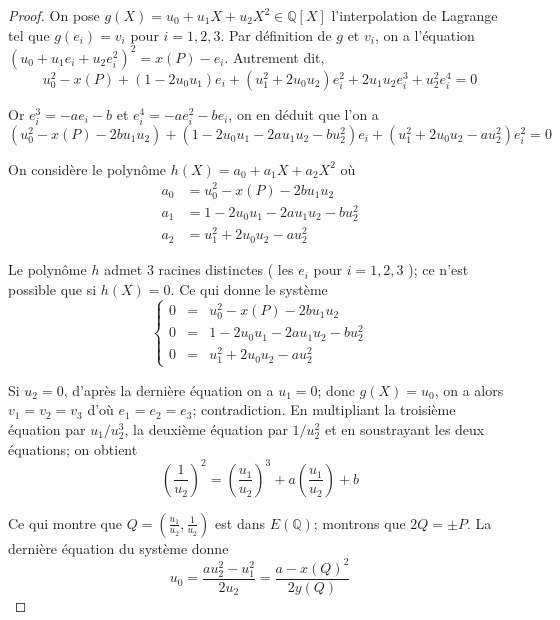 \documentclass{article}
\begin{document}
\begin{proof}
On pose $g(X) = u_{0} + u_{1}X + u_{2}X^2 \in \mathbb{Q}[X]$ l'interpolation de Lagrange tel que 
$g(e_{i}) = v_{i}$ pour $i=1,2,3$. Par définition de $g$ et $v_{i}$, on a l'équation 
$(u_{0}+u_{1}e_{i}+u_{2}e_{i}^2)^2 = x(P) - e_{i}$. Autrement dit,
\begin{equation*}
u_{0}^2 - x(P) + (1-2u_{0}u_{1})e_{i} + (u_{1}^2 + 2u_{0}u_{2})e_{i}^2 + 2u_{1}u_{2}e_{i}^3 + u_{2}^2e_{i}^4 = 0
\end{equation*}

Or $e_{i}^3 = -ae_{i} - b$ et $e_{i}^4 = -ae_{i}^2 - be_{i}$, on en déduit que l'on a
\begin{equation*}
(u_{0}^2 - x(P) - 2bu_{1}u_{2}) + (1-2u_{0}u_{1}-2au_{1}u_{2}-bu_{2}^2)e_{i} + (u_{1}^2 + 2u_{0}u_{2} - au_{2}^2)e_{i}^2 = 0
\end{equation*}

On considère le polynôme $h(X) = a_{0} + a_{1}X + a_{2}X^2$ où
\begin{align*}
a_{0} &= u_{0}^2 - x(P) - 2bu_{1}u_{2}\\
a_{1} &= 1-2u_{0}u_{1}-2au_{1}u_{2}-bu_{2}^2\\
a_{2} &= u_{1}^2 + 2u_{0}u_{2} - au_{2}^2
\end{align*}

Le polynôme $h$ admet 3 racines distinctes ( les $e_{i}$ pour $i=1,2,3$ ); ce n'est possible que si $h(X) = 0$. Ce qui donne le système
\begin{equation*}
\left\lbrace
\begin{array}{lcl}
0 &=& u_{0}^2 - x(P) - 2bu_{1}u_{2}\\
0 &=& 1-2u_{0}u_{1}-2au_{1}u_{2}-bu_{2}^2\\
0 &=& u_{1}^2 + 2u_{0}u_{2} - au_{2}^2
\end{array}\right.
\end{equation*}

Si $u_{2} = 0$, d'après la dernière équation on a $u_{1} = 0$; donc $g(X) = u_{0}$, on a alors $v_{1} = v_{2} = v_{3}$
d'où $e_{1} = e_{2} = e_{3}$; contradiction. En multipliant la troisième équation par $u_{1}/u_{2}^3$, la deuxième équation 
par $1/u_{2}^2$ et en soustrayant les deux équations; on obtient
\begin{equation*}
(\frac{1}{u_{2}})^2 = (\frac{u_{1}}{u_{2}})^3 + a(\frac{u_{1}}{u_{2}}) + b
\end{equation*}

Ce qui montre que $Q = (\frac{u_{1}}{u_{2}}, \frac{1}{u_{2}})$ est dans $E(\mathbb{Q})$; montrons que $2Q = \pm P$.
La dernière équation du système donne
\begin{equation*}
u_{0} = \frac{au_{2}^2 - u_{1}^2}{2u_{2}} = \frac{a - x(Q)^2}{2y(Q)}
\end{equation*}


\end{proof}
\end{document}
